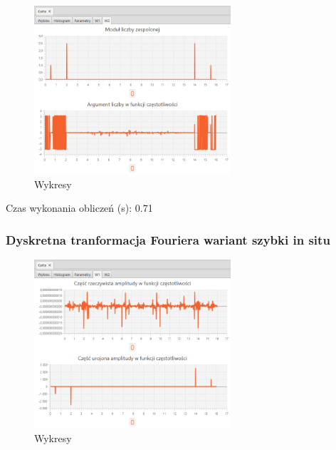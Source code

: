 \documentclass[12pt]{article}
\begin{document}
{{{                \begin{figure}[H]
                    \centering
                    \includegraphics[width=0.65\textwidth]{img/result/s1/01/W2_draw_1_sinus_sampling_trans_s1_data_205617.png}
                    \caption{Wykresy}
                \end{figure}

                Czas wykonania obliczeń (s): 0.71
            }
            \newpage

            \subsubsection{Dyskretna tranformacja Fouriera wariant szybki in situ} {

                \begin{figure}[H]
                    \centering
                    \includegraphics[width=0.65\textwidth]{img/result/s1/02/W1_draw_2_sinus_sampling_trans_s1_data_205623.png}
                    \caption{Wykresy}
                \end{figure}

}}}
\end{document}

